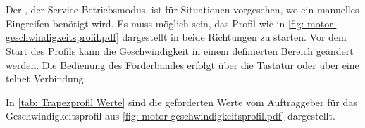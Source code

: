 \documentclass[./\jobname.tex]{subfiles}
\begin{document}
\section{\modeA}
%
Der \modeA, der Service-Betriebsmodus, ist für Situationen vorgesehen, wo ein manuelles Eingreifen benötigt wird. Es muss möglich sein, das Profil wie in \autoref{fig: motor-geschwindigkeitsprofil.pdf} dargestellt in beide Richtungen zu starten. Vor dem Start des Profils kann die Geschwindigkeit in einem definierten Bereich geändert werden.
Die Bedienung des Förderbandes erfolgt über die Tastatur oder über eine \gls{telnet} Verbindung. 
%
\begin{figure}[H]
	\centering
	\noindent{}
	\label{fig: motor-geschwindigkeitsprofil.pdf}
\end{figure}
%
In \autoref{tab: Trapezprofil Werte} sind die geforderten Werte vom Auftraggeber für das Geschwindigkeitsprofil aus \autoref{fig: motor-geschwindigkeitsprofil.pdf} dargestellt.
%
\end{document}
